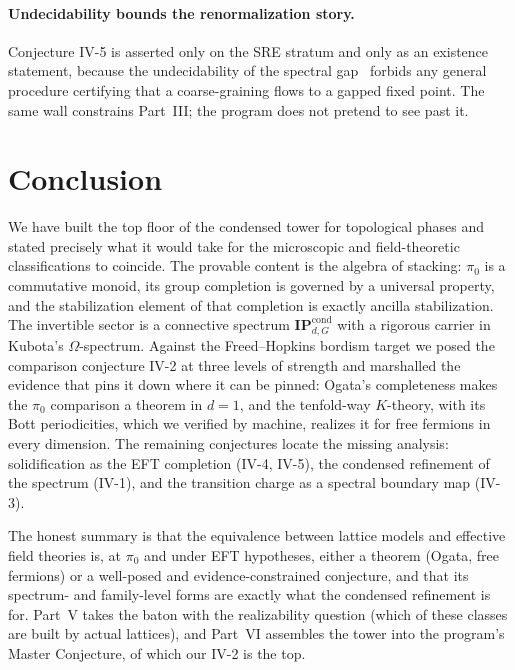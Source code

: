 \documentclass[12pt]{article}
\newcommand{\IPcond}{\mathbf{IP}^{\mathrm{cond}}}  %
\theoremstyle{definition}
\theoremstyle{remark}
\theoremstyle{plain}
\begin{document}
\paragraph{Undecidability bounds the renormalization story.} Conjecture IV-5 is
asserted only on the SRE stratum and only as an existence statement, because the
undecidability of the spectral gap~\cite{cpw-undecidable} forbids any general
procedure certifying that a coarse-graining flows to a gapped fixed point. The
same wall constrains Part~III; the program does not pretend to see past it.

\section{Conclusion}
\label{sec:conclusion}

We have built the top floor of the condensed tower for topological phases and
stated precisely what it would take for the microscopic and field-theoretic
classifications to coincide. The provable content is the algebra of stacking:
$\pi_0$ is a commutative monoid, its group completion is governed by a universal
property, and the stabilization element of that completion is exactly ancilla
stabilization. The invertible sector is a connective spectrum $\IPcond_{d,G}$ with
a rigorous carrier in Kubota's $\Omega$-spectrum. Against the Freed--Hopkins
bordism target we posed the comparison conjecture IV-2 at three levels of
strength and marshalled the evidence that pins it down where it can be pinned:
Ogata's completeness makes the $\pi_0$ comparison a theorem in $d=1$, and the
tenfold-way $K$-theory, with its Bott periodicities, which we verified by
machine, realizes it for free fermions in every dimension. The remaining
conjectures locate the missing analysis: solidification as the EFT completion
(IV-4, IV-5), the condensed refinement of the spectrum (IV-1), and the transition
charge as a spectral boundary map (IV-3).

The honest summary is that the equivalence between lattice models and effective
field theories is, at $\pi_0$ and under EFT hypotheses, either a theorem
(Ogata, free fermions) or a well-posed and evidence-constrained conjecture, and
that its spectrum- and family-level forms are exactly what the condensed
refinement is for. Part~V takes the baton with the realizability question (which
of these classes are built by actual lattices), and Part~VI assembles the tower
into the program's Master Conjecture, of which our IV-2 is the top.



\end{document}
